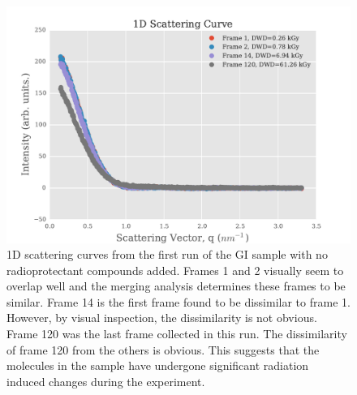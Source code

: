 \begin{figure}
    \centering
    \includegraphics[width=1.0\textwidth]{figures/saxs/scatter_curves.pdf}
    \caption[Increasing dissimilarity of 1D SAXS curves with increasing X-ray exposure.]{1D scattering curves from the first run of the GI sample with no radioprotectant compounds added.
    Frames 1 and 2 visually seem to overlap well and the merging analysis determines these frames to be similar.
    Frame 14 is the first frame found to be dissimilar to frame 1.
    However, by visual inspection, the dissimilarity is not obvious.
    Frame 120 was the last frame collected in this run.
    The dissimilarity of frame 120 from the others is obvious.
    This suggests that the molecules in the sample have undergone significant radiation induced changes during the experiment.}
    \label{fig:1D Scatter Curves}
\end{figure}

